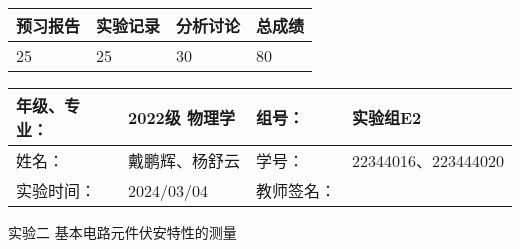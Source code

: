 \documentclass[dvipsnames, svgnames,a4paper,11pt]{article}
\begin{document}
	
	
	
	
	\begin{table}
		\renewcommand\arraystretch{1.7}
		\begin{tabularx}{\textwidth}{
				|X|X|X|X
				|X|X|X|X|}
			\hline
			\multicolumn{2}{|c|}{预习报告}&\multicolumn{2}{|c|}{实验记录}&\multicolumn{2}{|c|}{分析讨论}&\multicolumn{2}{|c|}{总成绩}\\
			\hline
			\LARGE 25 & & \LARGE25 & & \LARGE30 & & \LARGE80 & \\
			\hline
		\end{tabularx}
	\end{table}
	
	\begin{table}
		\renewcommand\arraystretch{1.7}
		\begin{tabularx}{\textwidth}{|X|X|X|X|}
			\hline
			年级、专业： & 2022级 物理学 &组号： & 实验组E2\\
			\hline
			姓名： & 戴鹏辉、杨舒云  & 学号： & 22344016、223444020\\
			\hline
			实验时间： & 2024/03/04 & 教师签名： & \\
			\hline
		\end{tabularx}
	\end{table}
	
	\begin{center}
		\LARGE 实验二 \quad 基本电路元件伏安特性的测量
	\end{center}
	
	
\end{document}
